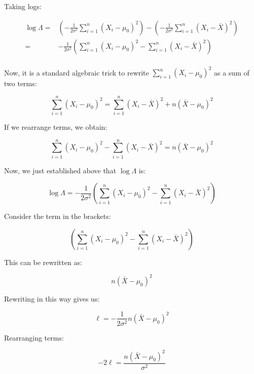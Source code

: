 \documentclass[12pt,]{krantz}
\begin{document}
Taking logs:

\begin{equation}
\begin{split}
\log \Lambda =& 
\left( -\frac{1}{2\sigma^2} \sum_{i=1}^n (X_i - \mu_0)^2  \right)-\left( -\frac{1}{2\sigma^2} \sum_{i=1}^n (X_i - \bar{X})^2  \right)\\
=& -\frac{1}{2\sigma^2} \left( \sum_{i=1}^n (X_i - \mu_0)^2  -  \sum_{i=1}^n (X_i - \bar{X})^2 \right)\\
\end{split}
\end{equation}

Now, it is a standard algebraic trick to rewrite \(\sum_{i=1}^n (X_i -\mu_0)^2\) as a sum of two terms:

\begin{equation}
\sum_{i=1}^n (X_i -\mu_0)^2 = \sum_{i=1}^n (X_i - \bar{X})^2 + n(\bar{X} - \mu_0)^2 
\end{equation}

If we rearrange terms, we obtain:

\begin{equation}
\sum_{i=1}^n (X_i -\mu_0)^2 - \sum_{i=1}^n (X_i - \bar{X})^2 = n(\bar{X} - \mu_0)^2 
\end{equation}

Now, we just established above that \(\log \Lambda\) is:

\begin{equation}
\log \Lambda= -\frac{1}{2\sigma^2} \left( \sum_{i=1}^n (X_i - \mu_0)^2  -  \sum_{i=1}^n (X_i - \bar{X})^2 \right)
\end{equation}

Consider the term in the brackets:

\begin{equation}
(\sum_{i=1}^n (X_i - \mu_0)^2  -  \sum_{i=1}^n (X_i - \bar{X})^2)
\end{equation}

This can be rewritten as:

\begin{equation}
n(\bar{X} - \mu_0)^2
\end{equation}

Rewriting in this way gives us:

\begin{equation}
\ell = -\frac{1}{2\sigma^2}   n(\bar{X} - \mu_0)^2 
\end{equation}

Rearranging terms:

\begin{equation}
-2 \ell =    \frac{n(\bar{X} - \mu_0)^2 }{\sigma^2}
\end{equation}
\end{document}
